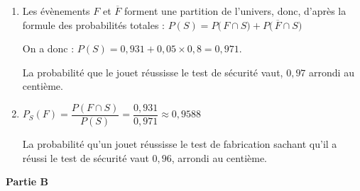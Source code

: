 \documentclass[10pt]{article}
\providecommand{\np}[2][]{{#2~#1}}
\begin{document}
\begin{enumerate}
	\item Les évènements $F$ et $\overline{F}$ forment une partition de l'univers, donc, d'après la formule des probabilités totales : \quad $P(S) = P\big(\,F\cap S\big) + P\big(\,\overline{F}\cap S\big) $

On a donc : \quad $P(S)=0,931 + 0,05\times 0,8 = 0,971$.

La probabilité que le jouet réussisse le test de sécurité vaut, $0,97$ arrondi au centième.

	\item $P_{S}(F)= \dfrac{P(F\cap S)}{P(S)} = \dfrac{0,931}{0,971}\approx \np{0,9588}$

La probabilité qu'un jouet  réussisse le test de fabrication  sachant qu'il a réussi le test de sécurité vaut $0,96$, arrondi au centième.
\end{enumerate}

\medskip

\textbf{Partie B}

\medskip
\end{document}
